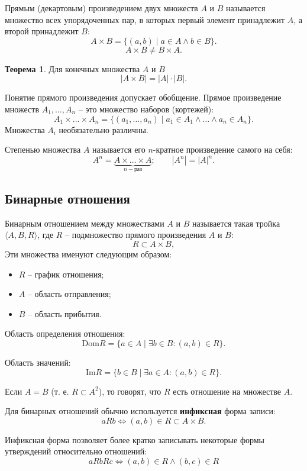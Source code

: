 \documentclass[a5paper, 11pt]{extarticle}
\theoremstyle{definition}
\newtheorem*{theorem*}{Теорема}
\theoremstyle{definition}
\theoremstyle{definition}
\numberwithin{figure}{section}
\numberwithin{table}{section}
\begin{document}
Прямым (декартовым) произведением двух множеств \(A\) и \(B\) называется множество всех упорядоченных пар, в которых первый элемент принадлежит \(A\), а второй принадлежит \(B\):
\[
    A \times B = \{(a, b) \mid a \in A \land b \in B\}.
\]
\[
    A \times B \neq B \times A.
\]

\begin{theorem*}
    Для конечных множества \(A\) и \(B\)
    \[
        |A \times B| = |A| \cdot |B|.
    \]
\end{theorem*}

Понятие прямого произведения допускает обобщение. Прямое произведение множеств \(A_1, \ldots, A_n\) -- это множество наборов (кортежей):
\[
    A_1 \times \ldots \times A_n
    =
    \{(a_1, \ldots, a_n) \mid a_1 \in A_1 \land \ldots \land a_n \in A_n\}.
\]
Множества \(A_i\) необязательно различны.

Степенью множества \(A\) называется его \(n\)-кратное произведение самого на себя:
\[
    A^n = \underbrace{A \times \ldots \times A}_{n-\text{раз}};
    \qquad
    |A^n| = |A|^n.
\]

\subsection{Бинарные отношения}

Бинарным отношением между множествами \(A\) и \(B\) называется такая тройка \(\langle A, B, R \rangle\), где \(R\) -- подмножество прямого произведения \(A\) и \(B\):
\[
    R \subset A \times B,
\]
Эти множества именуют следующим образом:
\begin{itemize}
    \item \(R\) -- график отношения;
    \item \(A\) -- область отправления;
    \item \(B\) -- область прибытия.
\end{itemize}

Область определения отношения:
\[
    \text{Dom} R = \{a \in A \mid \exists b \in B : (a, b) \in R\}.
\]

Область значений:
\[
    \text{Im} R = \{b \in B \mid \exists a \in A : (a, b) \in R\}.
\]

Если \(A = B\) (т. е. \(R \subset A^2\)), то говорят, что \(R\) есть отношение на множестве \(A\).

Для бинарных отношений обычно используется \textbf{инфиксная} форма записи:
\[
    aRb \iff (a, b) \in R \subset A \times B.
\]

Инфиксная форма позволяет более кратко записывать некоторые формы утверждений относительно отношений:
\[
    aRbRc \iff (a, b) \in R \land (b, c) \in R
\]
\end{document}
